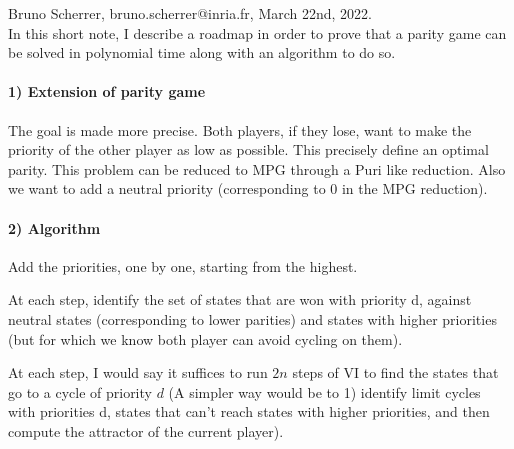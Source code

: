 \documentclass{article}
\begin{document}
Bruno Scherrer, bruno.scherrer@inria.fr, March 22nd, 2022.
~\\

In this short note, I describe a roadmap in order to prove that a parity game can be solved in polynomial time along with an algorithm to do so.


\paragraph{1) Extension of parity game}

The goal is made more precise. Both players, if they lose, want to make the priority of the other player as low as possible. This precisely define an optimal parity. This problem can be reduced to MPG through a Puri like reduction.
Also we want to add a neutral priority (corresponding to 0 in the MPG reduction).

\paragraph{2) Algorithm}

Add the priorities, one by one, starting from the highest.

At each step, identify the set of states that are won with priority d, against neutral states (corresponding to lower parities) and states with higher priorities (but for which we know both player can avoid cycling on them).

At each step, I would say it suffices to run $2n$ steps of VI to find the states that go to a cycle of priority $d$ (A simpler way would be to 1) identify limit cycles with priorities d, states that can't reach states with higher priorities, and then compute the attractor of the current player).
\end{document}
